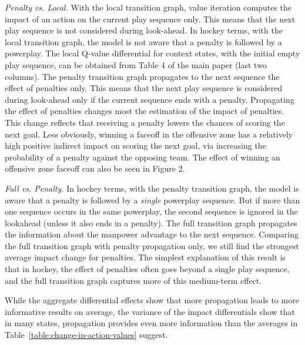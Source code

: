\documentclass[]{article}
\begin{document}
{\em Penalty vs. Local.}
With the local transition graph, value iteration computes the impact of an action on the current play sequence only. This means that the next play sequence is not considered during look-ahead. In hockey terms, with the local transition graph, the model is not aware that a penalty is followed by a powerplay.
The local Q-value differential for context states, with the initial empty play sequence, can be obtained from Table 4 of the main paper
(last two columns).
The penalty transition graph propagates to the next sequence the effect of penalties only. This means that the next play sequence is considered during look-ahead only if the current sequence ends with a penalty.
Propagating the effect of penalties changes most the estimation of the impact of penalties. This change reflects that receiving a penalty lowers the chances of scoring the next goal.
Less obviously, winning a faceoff in the offensive zone has a relatively high positive indirect impact on scoring the next goal, via increasing the probability of a penalty against the opposing team.
The effect of winning an offensive zone faceoff can also be seen in Figure 2.

{\em Full vs. Penalty.} In hockey terms, with the penalty transition graph, the model is aware that a penalty is followed by a {\em single} powerplay sequence. But if more than one sequence occurs in the same powerplay, the second sequence is ignored in the lookahead (unless it also ends in a penalty). The full transition graph propagates the information about the manpower advantage to the next sequence.
Comparing the full transition graph with penalty propagation only, we still find the strongest average impact change for penalties. The simplest explanation of this result is that in hockey, the effect of penalties often goes beyond a single play sequence, and the full transition graph captures more of this medium-term effect.

While the aggregate differential effects show that more propagation leads to more informative results on average, the variance of the impact differentials show that in many states, propagation provides even more information than the averages in Table~\ref{table:change-in-action-values} suggest.
\end{document}
